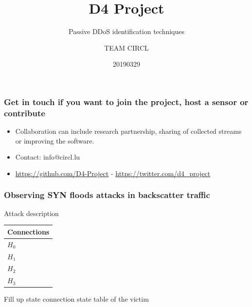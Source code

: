 \documentclass{beamer}
\title{D4 Project}
\subtitle{Passive DDoS identification techniques}
\author{TEAM CIRCL}
\institute{Team CIRCL \\ \url{https://www.d4-project.org/}}
\date{20190329}
\begin{document}
    \begin{frame}
        \maketitle
    \end{frame}


\begin{frame}
\frametitle{Get in touch if you want to join the project, host a sensor or contribute}
\begin{itemize}
\item Collaboration can include research partnership, sharing of collected streams or improving the software.
\item Contact: info@circl.lu
\item \url{https://github.com/D4-Project} -  \url{https://twitter.com/d4_project}
\end{itemize}
\end{frame}

\begin{frame}
\frametitle{Observing SYN floods attacks in backscatter traffic}
Attack description



\begin{center}
    \begin{tabular}{|l|}
        \hline
        Connections\\
        \hline
        $H_{0}$\\
        \hline
        $H_{1}$\\
        \hline
        $H_{2}$\\
        \hline
        $H_{3}$\\
        \hline
    \end{tabular}
\end{center}

\begin{center}
Fill up state connection state table of the victim
\end{center}

\end{frame}
\end{document}
